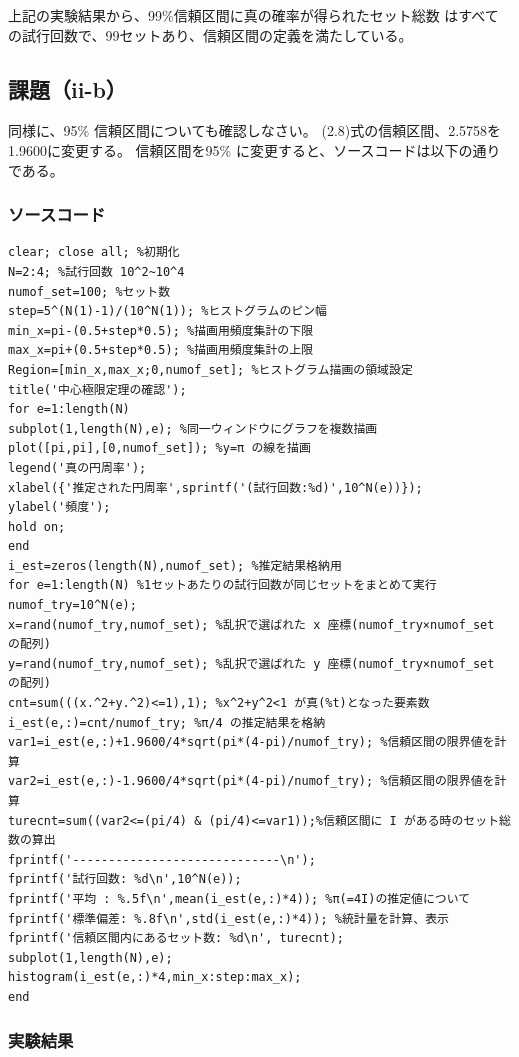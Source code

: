 \documentclass[10pt,a4paper,titlepage]{jreport} %
\begin{document}
上記の実験結果から、99\%信頼区間に真の確率が得られたセット総数
はすべての試行回数で、99セットあり、信頼区間の定義を満たしている。

\subsection{課題（ii-b）}

同様に、95\% 信頼区間についても確認しなさい。
(2.8)式の信頼区間、2.5758を1.9600に変更する。
信頼区間を95\% に変更すると、ソースコードは以下の通りである。

\subsubsection{ソースコード}

\begin{lstlisting}[caption=95\%信頼区間]
clear; close all; %初期化
N=2:4; %試行回数 10^2~10^4 
numof_set=100; %セット数
step=5^(N(1)-1)/(10^N(1)); %ヒストグラムのピン幅
min_x=pi-(0.5+step*0.5); %描画用頻度集計の下限
max_x=pi+(0.5+step*0.5); %描画用頻度集計の上限
Region=[min_x,max_x;0,numof_set]; %ヒストグラム描画の領域設定
title('中心極限定理の確認');
for e=1:length(N)
subplot(1,length(N),e); %同一ウィンドウにグラフを複数描画
plot([pi,pi],[0,numof_set]); %y=π の線を描画
legend('真の円周率');
xlabel({'推定された円周率',sprintf('(試行回数:%d)',10^N(e))});
ylabel('頻度');
hold on;
end
i_est=zeros(length(N),numof_set); %推定結果格納用
for e=1:length(N) %1セットあたりの試行回数が同じセットをまとめて実行
numof_try=10^N(e);
x=rand(numof_try,numof_set); %乱択で選ばれた x 座標(numof_try×numof_set の配列)
y=rand(numof_try,numof_set); %乱択で選ばれた y 座標(numof_try×numof_set の配列)
cnt=sum(((x.^2+y.^2)<=1),1); %x^2+y^2<1 が真(%t)となった要素数
i_est(e,:)=cnt/numof_try; %π/4 の推定結果を格納
var1=i_est(e,:)+1.9600/4*sqrt(pi*(4-pi)/numof_try); %信頼区間の限界値を計算
var2=i_est(e,:)-1.9600/4*sqrt(pi*(4-pi)/numof_try); %信頼区間の限界値を計算
turecnt=sum((var2<=(pi/4) & (pi/4)<=var1));%信頼区間に I がある時のセット総数の算出
fprintf('-----------------------------\n');
fprintf('試行回数: %d\n',10^N(e));
fprintf('平均 : %.5f\n',mean(i_est(e,:)*4)); %π(=4I)の推定値について
fprintf('標準偏差: %.8f\n',std(i_est(e,:)*4)); %統計量を計算、表示
fprintf('信頼区間内にあるセット数: %d\n', turecnt);
subplot(1,length(N),e);
histogram(i_est(e,:)*4,min_x:step:max_x);
end
\end{lstlisting}

\subsubsection{実験結果}
\end{document}
